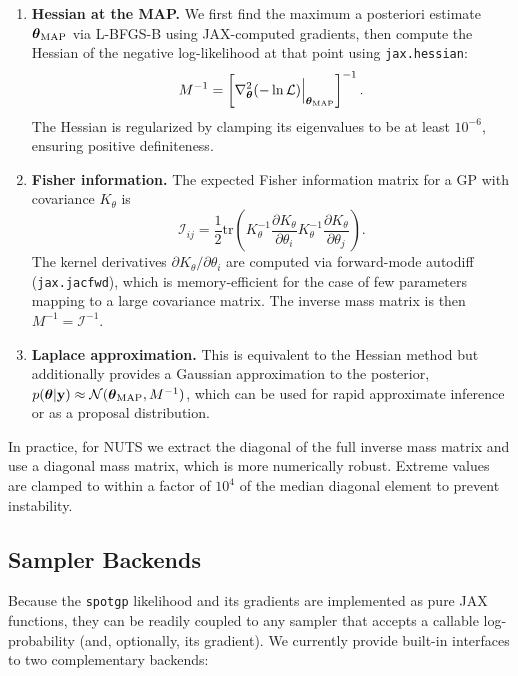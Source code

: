 \documentclass[preprint]{aastex702}
\newcommand{\code}[1]{{\texttt{#1}}}
\begin{document}
\begin{enumerate}
    \item \textbf{Hessian at the MAP.} We first find the maximum a posteriori estimate $\boldsymbol{\theta}_{\rm MAP}$ via L-BFGS-B using JAX-computed gradients, then compute the Hessian of the negative log-likelihood at that point using \code{jax.hessian}:
    \begin{equation}
        M^{-1} = \left[\nabla^2_{\boldsymbol{\theta}}(-\ln\mathcal{L})\Big|_{\boldsymbol{\theta}_{\rm MAP}}\right]^{-1}.
    \end{equation}
    The Hessian is regularized by clamping its eigenvalues to be at least $10^{-6}$, ensuring positive definiteness.

    \item \textbf{Fisher information.} The expected Fisher information matrix for a GP with covariance $K_\theta$ is
    \begin{equation}
        \mathcal{I}_{ij} = \frac{1}{2}\mathrm{tr}\left(K_\theta^{-1}\frac{\partial K_\theta}{\partial\theta_i} K_\theta^{-1}\frac{\partial K_\theta}{\partial\theta_j}\right).
        \label{eq:fisher}
    \end{equation}
    The kernel derivatives $\partial K_\theta / \partial \theta_i$ are computed via forward-mode autodiff (\code{jax.jacfwd}), which is memory-efficient for the case of few parameters mapping to a large covariance matrix. The inverse mass matrix is then $M^{-1} = \mathcal{I}^{-1}$.

    \item \textbf{Laplace approximation.} This is equivalent to the Hessian method but additionally provides a Gaussian approximation to the posterior, $p(\boldsymbol{\theta}|\mathbf{y}) \approx \mathcal{N}(\boldsymbol{\theta}_{\rm MAP}, M^{-1})$, which can be used for rapid approximate inference or as a proposal distribution.
\end{enumerate}

In practice, for NUTS we extract the diagonal of the full inverse mass matrix and use a diagonal mass matrix, which is more numerically robust. Extreme values are clamped to within a factor of $10^4$ of the median diagonal element to prevent instability.

\subsection{Sampler Backends} \label{subsec:sampler_backends}

Because the \code{spotgp} likelihood and its gradients are implemented as pure JAX functions, they can be readily coupled to any sampler that accepts a callable log-probability (and, optionally, its gradient). We currently provide built-in interfaces to two complementary backends:
\end{document}
